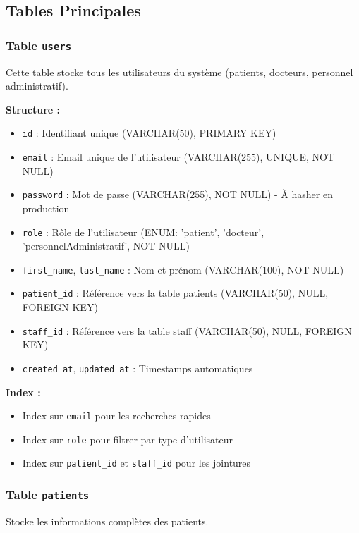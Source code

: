 \documentclass[12pt,a4paper]{report}
\begin{document}
\subsection{Tables Principales}

\subsubsection{Table \texttt{users}}

Cette table stocke tous les utilisateurs du système (patients, docteurs, personnel administratif).

\textbf{Structure :}
\begin{itemize}
    \item \texttt{id} : Identifiant unique (VARCHAR(50), PRIMARY KEY)
    \item \texttt{email} : Email unique de l'utilisateur (VARCHAR(255), UNIQUE, NOT NULL)
    \item \texttt{password} : Mot de passe (VARCHAR(255), NOT NULL) - À hasher en production
    \item \texttt{role} : Rôle de l'utilisateur (ENUM: 'patient', 'docteur', 'personnelAdministratif', NOT NULL)
    \item \texttt{first\_name}, \texttt{last\_name} : Nom et prénom (VARCHAR(100), NOT NULL)
    \item \texttt{patient\_id} : Référence vers la table patients (VARCHAR(50), NULL, FOREIGN KEY)
    \item \texttt{staff\_id} : Référence vers la table staff (VARCHAR(50), NULL, FOREIGN KEY)
    \item \texttt{created\_at}, \texttt{updated\_at} : Timestamps automatiques
\end{itemize}

\textbf{Index :}
\begin{itemize}
    \item Index sur \texttt{email} pour les recherches rapides
    \item Index sur \texttt{role} pour filtrer par type d'utilisateur
    \item Index sur \texttt{patient\_id} et \texttt{staff\_id} pour les jointures
\end{itemize}

\subsubsection{Table \texttt{patients}}

Stocke les informations complètes des patients.
\end{document}
